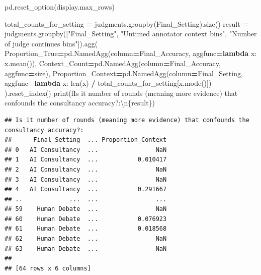 \documentclass[
]{article}
\newenvironment{Shaded}{\begin{snugshade}}{\end{snugshade}}
\newcommand{\BuiltInTok}[1]{#1}
\newcommand{\CharTok}[1]{\textcolor[rgb]{0.31,0.60,0.02}{#1}}
\newcommand{\KeywordTok}[1]{\textcolor[rgb]{0.13,0.29,0.53}{\textbf{#1}}}
\newcommand{\NormalTok}[1]{#1}
\newcommand{\OperatorTok}[1]{\textcolor[rgb]{0.81,0.36,0.00}{\textbf{#1}}}
\newcommand{\SpecialCharTok}[1]{\textcolor[rgb]{0.00,0.00,0.00}{#1}}
\newcommand{\SpecialStringTok}[1]{\textcolor[rgb]{0.31,0.60,0.02}{#1}}
\newcommand{\StringTok}[1]{\textcolor[rgb]{0.31,0.60,0.02}{#1}}
\begin{document}
\begin{Shaded}
\begin{Highlighting}[]
\NormalTok{pd.reset\_option(}\StringTok{\textquotesingle{}display.max\_rows\textquotesingle{}}\NormalTok{)}

\NormalTok{total\_counts\_for\_setting }\OperatorTok{=}\NormalTok{ judgments.groupby(}\StringTok{\textquotesingle{}Final\_Setting\textquotesingle{}}\NormalTok{).size()}
\NormalTok{result }\OperatorTok{=}\NormalTok{ judgments.groupby([}\StringTok{"Final\_Setting"}\NormalTok{, }\StringTok{"Untimed annotator context bins"}\NormalTok{, }\StringTok{"Number of judge continues bins"}\NormalTok{]).agg(}
\NormalTok{    Proportion\_True}\OperatorTok{=}\NormalTok{pd.NamedAgg(column}\OperatorTok{=}\StringTok{\textquotesingle{}Final\_Accuracy\textquotesingle{}}\NormalTok{, aggfunc}\OperatorTok{=}\KeywordTok{lambda}\NormalTok{ x: x.mean()),}
\NormalTok{    Context\_Count}\OperatorTok{=}\NormalTok{pd.NamedAgg(column}\OperatorTok{=}\StringTok{\textquotesingle{}Final\_Accuracy\textquotesingle{}}\NormalTok{, aggfunc}\OperatorTok{=}\StringTok{\textquotesingle{}size\textquotesingle{}}\NormalTok{),}
\NormalTok{    Proportion\_Context}\OperatorTok{=}\NormalTok{pd.NamedAgg(column}\OperatorTok{=}\StringTok{\textquotesingle{}Final\_Setting\textquotesingle{}}\NormalTok{, aggfunc}\OperatorTok{=}\KeywordTok{lambda}\NormalTok{ x: }\BuiltInTok{len}\NormalTok{(x) }\OperatorTok{/}\NormalTok{ total\_counts\_for\_setting[x.mode()])}
\NormalTok{).reset\_index()}
\BuiltInTok{print}\NormalTok{(}\SpecialStringTok{f\textquotesingle{}Is it number of rounds (meaning more evidence) that confounds the consultancy accuracy?:}\CharTok{\textbackslash{}n}\SpecialCharTok{\{}\NormalTok{result}\SpecialCharTok{\}}\SpecialStringTok{\textquotesingle{}}\NormalTok{)}
\end{Highlighting}
\end{Shaded}

\begin{verbatim}
## Is it number of rounds (meaning more evidence) that confounds the consultancy accuracy?:
##      Final_Setting  ... Proportion_Context
## 0   AI Consultancy  ...                NaN
## 1   AI Consultancy  ...           0.010417
## 2   AI Consultancy  ...                NaN
## 3   AI Consultancy  ...                NaN
## 4   AI Consultancy  ...           0.291667
## ..             ...  ...                ...
## 59    Human Debate  ...                NaN
## 60    Human Debate  ...           0.076923
## 61    Human Debate  ...           0.018568
## 62    Human Debate  ...                NaN
## 63    Human Debate  ...                NaN
## 
## [64 rows x 6 columns]
\end{verbatim}
\end{document}
